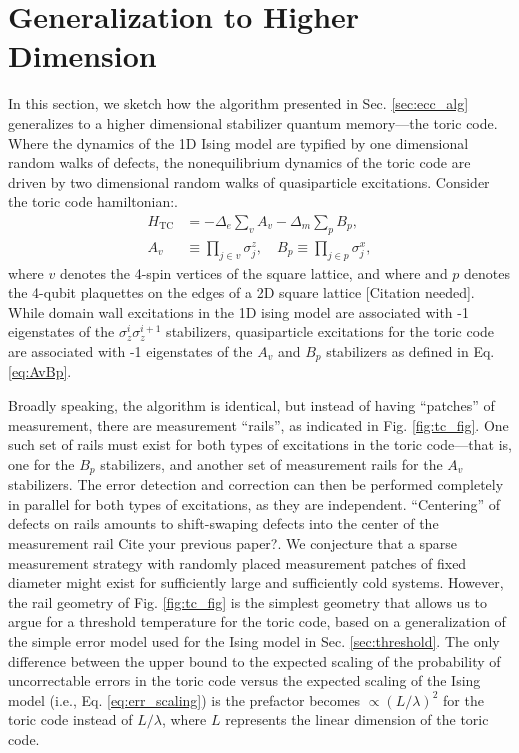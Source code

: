 \documentclass[twocolumn,superscriptaddress,aps,prb,floatfix]{revtex4-1}
\newcommand{\Htc}{H_{\mathrm{TC}}}
\newcommand{\figref}[1]{Fig. \ref{#1}}
\newcommand{\red}[1]{{\color{red} { #1}}}
\newcommand{\needcite}{{\color{blue} {[Citation needed]}}}
\begin{document}
\section{Generalization to Higher Dimension}
\label{sec:tc_alg}

 In this section, we sketch how the algorithm presented in Sec. \ref{sec:ecc_alg} generalizes to a higher dimensional stabilizer quantum memory---the toric code.  Where the dynamics of the 1D Ising model are typified by one dimensional random walks of defects, the nonequilibrium dynamics of the toric code are driven by two dimensional random walks of quasiparticle excitations.  Consider the toric code hamiltonian:.
 \begin{align}
\Htc &= -\Delta_e \sum_v A_v -\Delta_m \sum_p B_p ,\label{eq:HTC}\\
A_v &\equiv \prod_{j \in v} \sigma_j^z,\quad B_p \equiv \prod_{j \in p} \sigma_j^x,\label{eq:AvBp}
\end{align}
\noindent
where $v$ denotes the 4-spin vertices of the square lattice, and where and $p$ denotes the 4-qubit plaquettes on the edges of a 2D square lattice\needcite.
While domain wall excitations in the 1D ising model are associated with -1 eigenstates of the $\sigma_z^i \sigma_z^{i+1}$ stabilizers, quasiparticle excitations for the toric code are associated with -1 eigenstates of the $A_v$ and $B_p$ stabilizers as defined in Eq. \ref{eq:AvBp}.
 
 Broadly speaking, the algorithm is identical, but instead of having ``patches'' of measurement, there are measurement ``rails'', as indicated in \figref{fig:tc_fig}.  One such set of rails must exist for both types of excitations in the toric code---that is, one for the $B_p$ stabilizers, and another set of measurement rails for the $A_v$ stabilizers.  The error detection and correction can then be performed completely in parallel for both types of excitations, as they are independent.  ``Centering'' of defects on rails amounts to shift-swaping defects into the center of the measurement rail \red{Cite your previous paper?}.  We conjecture that a sparse measurement strategy with randomly placed measurement patches of fixed diameter might exist for sufficiently large and sufficiently cold systems.  However, the rail geometry of \figref{fig:tc_fig} is the simplest geometry that allows us to argue for a threshold temperature for the toric code, based on a generalization of the simple error model used for the Ising model in Sec. \ref{sec:threshold}.  The only difference between the upper bound to the expected scaling of the probability of uncorrectable errors in the toric code versus the expected scaling of the Ising model (i.e., Eq. \ref{eq:err_scaling}) is the prefactor becomes $\propto (L/\lambda)^2$ for the toric code instead of $L/\lambda$, where $L$ represents the linear dimension of the toric code.
\end{document}
